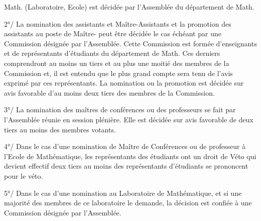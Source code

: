 
Math. (Laboratoire, Ecole) est décidée par l'Assemblée du département de Math.

2°/ La nomination des assistants et Maître-Assistants et la promotion des assistants au poste de Maître- peut être décidée le cas échéant par une Commission désignée par l'Assemblée. Cette Commission est formée d'enseignants et de représentants d'étudiants du département de Math. Ces derniers comprendront au moins un tiers et au plus une moitié des membres de la Commission et, il est entendu que le plus grand compte sera tenu de l'avis exprimé par ces représentants. La nomination ou la promotion est décidée sur avis favorable d'au moins deux tiers des membres de la Commission.

3°/ La nomination des maîtres de conférences ou des professeurs se fait par l'Assemblée réunie en session plénière. Elle est décidée sur avis favorable de deux tiers au moins des membres votants.

4°/ Dans le cas d'une nomination de Maître de Conférences ou de professeur à l'Ecole de Mathématique, les représentants des étudiants ont un droit de Véto qui devient effectif  deux tiers au moins des représentants d'étudiants se prononcent pour le véto.

5°/ Dans le cas d'une nomination au Laboratoire de Mathématique, et si une majorité des membres de ce laboratoire le demande, la décision est confiée à une Commission désignée par l'Assemblée.
